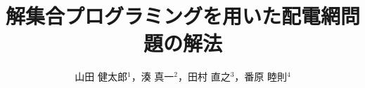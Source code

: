 \documentclass[japanese,dvipdfmx]{jssst_ppl} %
\title{解集合プログラミングを用いた配電網問題の解法}
\author{山田 健太郎$^1$，湊 真一$^2$，田村 直之$^3$，番原 睦則$^4$}
\begin{document}
\maketitle
\begin{abstract}

\end{abstract}










\end{document}
